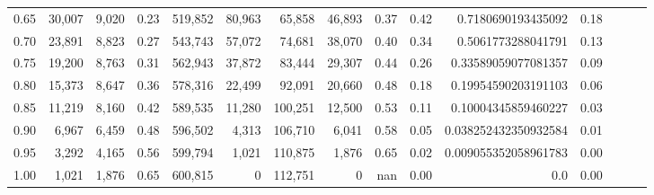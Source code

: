 \begin{tabular}{rrrrrrrrrrrrrrr}
0.65 &  30,007 &  9,020 &  0.23 &  519,852 &   80,963 &   65,858 &   46,893 &  0.37 &  0.42 &    0.7180690193435092 &      0.18 \\
0.70 &  23,891 &  8,823 &  0.27 &  543,743 &   57,072 &   74,681 &   38,070 &  0.40 &  0.34 &    0.5061773288041791 &      0.13 \\
0.75 &  19,200 &  8,763 &  0.31 &  562,943 &   37,872 &   83,444 &   29,307 &  0.44 &  0.26 &   0.33589059077081357 &      0.09 \\
0.80 &  15,373 &  8,647 &  0.36 &  578,316 &   22,499 &   92,091 &   20,660 &  0.48 &  0.18 &   0.19954590203191103 &      0.06 \\
0.85 &  11,219 &  8,160 &  0.42 &  589,535 &   11,280 &  100,251 &   12,500 &  0.53 &  0.11 &   0.10004345859460227 &      0.03 \\
0.90 &   6,967 &  6,459 &  0.48 &  596,502 &    4,313 &  106,710 &    6,041 &  0.58 &  0.05 &  0.038252432350932584 &      0.01 \\
0.95 &   3,292 &  4,165 &  0.56 &  599,794 &    1,021 &  110,875 &    1,876 &  0.65 &  0.02 &  0.009055352058961783 &      0.00 \\
1.00 &   1,021 &  1,876 &  0.65 &  600,815 &        0 &  112,751 &        0 &   nan &  0.00 &                   0.0 &      0.00 \\
\bottomrule
\end{tabular}
